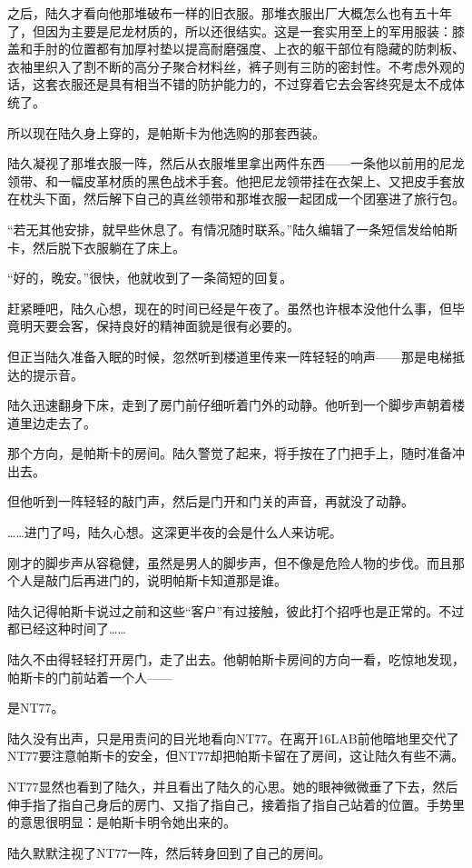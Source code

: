 之后，陆久才看向他那堆破布一样的旧衣服。那堆衣服出厂大概怎么也有五十年了，但因为主要是尼龙材质的，所以还很结实。这是一套实用至上的军用服装：膝盖和手肘的位置都有加厚衬垫以提高耐磨强度、上衣的躯干部位有隐藏的防刺板、衣袖里织入了割不断的高分子聚合材料丝，裤子则有三防的密封性。不考虑外观的话，这套衣服还是具有相当不错的防护能力的，不过穿着它去会客终究是太不成体统了。

所以现在陆久身上穿的，是帕斯卡为他选购的那套西装。

陆久凝视了那堆衣服一阵，然后从衣服堆里拿出两件东西——一条他以前用的尼龙领带、和一幅皮革材质的黑色战术手套。他把尼龙领带挂在衣架上、又把皮手套放在枕头下面，然后解下自己的真丝领带和那堆衣服一起团成一个团塞进了旅行包。

“若无其他安排，就早些休息了。有情况随时联系。”陆久编辑了一条短信发给帕斯卡，然后脱下衣服躺在了床上。

“好的，晚安。”很快，他就收到了一条简短的回复。

赶紧睡吧，陆久心想，现在的时间已经是午夜了。虽然也许根本没他什么事，但毕竟明天要会客，保持良好的精神面貌是很有必要的。

但正当陆久准备入眠的时候，忽然听到楼道里传来一阵轻轻的响声——那是电梯抵达的提示音。

陆久迅速翻身下床，走到了房门前仔细听着门外的动静。他听到一个脚步声朝着楼道里边走去了。

那个方向，是帕斯卡的房间。陆久警觉了起来，将手按在了门把手上，随时准备冲出去。

但他听到一阵轻轻的敲门声，然后是门开和门关的声音，再就没了动静。

……进门了吗，陆久心想。这深更半夜的会是什么人来访呢。

刚才的脚步声从容稳健，虽然是男人的脚步声，但不像是危险人物的步伐。而且那个人是敲门后再进门的，说明帕斯卡知道那是谁。

陆久记得帕斯卡说过之前和这些“客户”有过接触，彼此打个招呼也是正常的。不过都已经这种时间了……

陆久不由得轻轻打开房门，走了出去。他朝帕斯卡房间的方向一看，吃惊地发现，帕斯卡的门前站着一个人——

是NT77。

陆久没有出声，只是用责问的目光地看向NT77。在离开16LAB前他暗地里交代了NT77要注意帕斯卡的安全，但NT77却把帕斯卡留在了房间，这让陆久有些不满。

NT77显然也看到了陆久，并且看出了陆久的心思。她的眼神微微垂了下去，然后伸手指了指自己身后的房门、又指了指自己，接着指了指自己站着的位置。手势里的意思很明显：是帕斯卡明令她出来的。

陆久默默注视了NT77一阵，然后转身回到了自己的房间。

